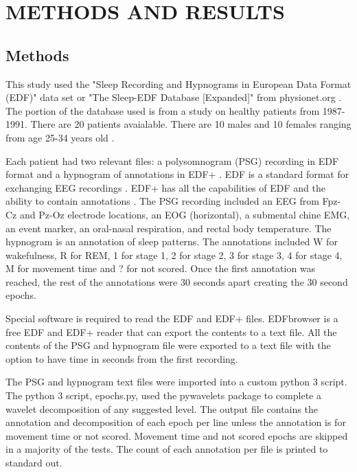 \documentclass[12pt, oneside]{book}
\begin{document}
\chapter{\textbf{METHODS AND RESULTS}}

\section{\textbf{Methods}}
This study used the "Sleep Recording and Hypnograms in European Data Format (EDF)" data set or "The Sleep-EDF Database [Expanded]" from physionet.org \cite{noauthor_sleep-edf_nodate}. The portion of the database used is from a study on healthy patients from 1987-1991. There are 20 patients avaialable. There are 10 males and 10 females ranging from age 25-34 years old \cite{noauthor_sleep-edf_nodate}. 

Each patient had two relevant files: a polysomnogram (PSG) recording in EDF format and a hypnogram of annotations in EDF+ \cite{noauthor_sleep-edf_nodate}. EDF is a standard format for exchanging EEG recordings \cite{noauthor_european_nodate}. EDF+ has all the capabilities of EDF and the ability to contain annotations \cite{noauthor_european_nodate}. The PSG recording included an EEG from Fpz-Cz and Pz-Oz electrode locations, an EOG (horizontal), a submental chine EMG, an event marker, an oral-nasal respiration, and rectal body temperature. The hypnogram is an annotation of sleep patterns. The annotations included W for wakefulness, R for REM, 1 for stage 1, 2 for stage 2, 3 for stage 3, 4 for stage 4, M for movement time and ? for not scored. Once the first annotation was reached, the rest of the annotations were 30 seconds apart creating the 30 second epochs.

Special software is required to read the EDF and EDF+ files. EDFbrowser is a free EDF and EDF+ reader that can export the contents to a text file. All the contents of the PSG and hypnogram file were exported to a text file with the option to have time in seconds from the first recording.

The PSG and hypnogram text files were imported into a custom python 3 script. The python 3 script, epochs.py, used the pywavelets package to complete a wavelet decomposition of any suggested level. The output file contains the annotation and decomposition of each epoch per line unless the annotation is for movement time or not scored. Movement time and not scored epochs are skipped in a majority of the tests. The count of each annotation per file is printed to standard out.
\end{document}
